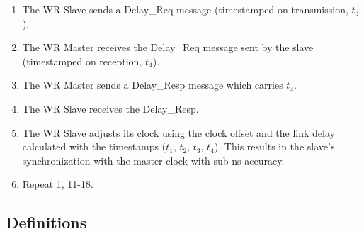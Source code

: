 \documentclass[a4paper, 12pt]{article}
\begin{document}
\begin{enumerate}
\item The WR Slave sends a Delay\_Req message (timestamped on transmission, $t_3$).
\item The WR Master receives the Delay\_Req message sent by the slave (timestamped on reception, $t_4$).
\item The WR Master sends a Delay\_Resp message which carries $t_4$.
\item The WR Slave receives the Delay\_Resp.
\item The WR Slave adjusts its clock using the clock offset and the link delay calculated with 
the timestamps ($t_{1}$, $t_{2}$, $t_{3}$, $t_{4}$). This results in the slave's synchronization 
with the master clock with sub-ns accuracy.
\item Repeat 1, 11-18.
\end{enumerate}

\newpage

\subsection{Definitions}
\label{sec:definitions}
\end{document}
